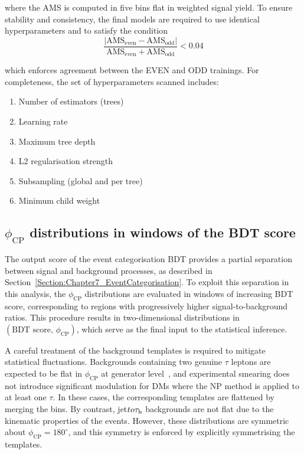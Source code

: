 where the \ac{AMS} is computed in five bins flat in weighted signal yield. To ensure stability and consistency, the final models are required to use identical hyperparameters and to satisfy the condition
\begin{equation}
\frac{|\mathrm{AMS}_{\text{even}} - \mathrm{AMS}_{\text{odd}}|}{\mathrm{AMS}_{\text{even}} + \mathrm{AMS}_{\text{odd}}} < 0.04
\end{equation}

which enforces agreement between the EVEN and ODD trainings. For completeness, the set of hyperparameters scanned includes: 
\begin{enumerate}[label=(\roman*)]
    \item Number of estimators (trees)  
    \item Learning rate  
    \item Maximum tree depth  
    \item L2 regularisation strength  
    \item Subsampling (global and per tree)  
    \item Minimum child weight  
\end{enumerate}

\subsection{\texorpdfstring{$\phi_\text{CP}$}{phicp} distributions in windows of the BDT score}

The output score of the event categorisation BDT provides a partial separation between signal and background processes, as described in Section~\ref{Section:Chapter7_EventCategorisation}. 
To exploit this separation in this analysis, the $\phi_{\mathrm{CP}}$ distributions are evaluated in windows of increasing BDT score, corresponding to regions with progressively higher signal-to-background ratios. 
This procedure results in two-dimensional distributions in $(\text{BDT score},\,\phi_{\mathrm{CP}})$, which serve as the final input to the statistical inference.  

A careful treatment of the background templates is required to mitigate statistical fluctuations. Backgrounds containing two genuine $\tau$ leptons are expected to be flat in $\phi_{\mathrm{CP}}$ at generator level~\cite{Berge:2014sra}, and experimental smearing does not introduce significant modulation for \acp{DM} where the \ac{NP} method is applied to at least one $\tau$. In these cases, the corresponding templates are flattened by merging the bins. By contrast, jet$to\tau_\mathrm{h}$ backgrounds are not flat due to the kinematic properties of the events. However, these distributions are symmetric about $\phi_{\mathrm{CP}} = 180^\circ$, and this symmetry is enforced by explicitly symmetrising the templates.

